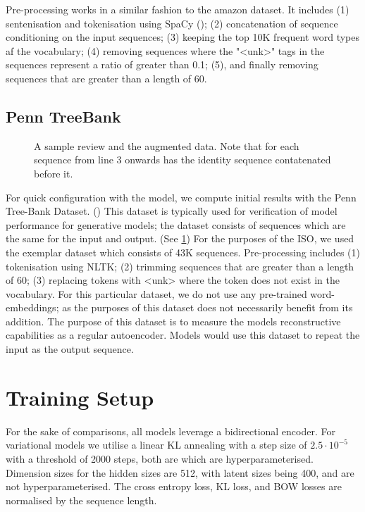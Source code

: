 \documentclass[12pt,twoside]{report}
\begin{document}
Pre-processing works in a similar fashion to the amazon dataset. It includes (1) sentenisation and tokenisation using SpaCy (\cite{honnibal_spacy_2017}); (2) concatenation of sequence conditioning on the input sequences; (3) keeping the top 10K frequent word types af the vocabulary; (4) removing sequences where the "<unk>" tags in the sequences represent a ratio of greater than 0.1; (5), and finally removing sequences that are greater than a length of 60. 

\subsection{Penn TreeBank}

\begin{figure}[!ht]
	\centering
	
	\caption{A sample review and the augmented data. Note that for each sequence from line 3 onwards has the identity sequence contatenated before it. \label{ex_dataset:ptb}}
	\end{figure}

For quick configuration with the model, we compute initial results with the Penn Tree-Bank Dataset. (\cite{marcus_building_2002}) This dataset is typically used for verification of model performance for generative models; the dataset consists of sequences which are the same for the input and output. (See \ref{ex_dataset:ptb}) For the purposes of the ISO, we used the exemplar dataset which consists of 43K sequences. Pre-processing includes (1) tokenisation using NLTK; (2) trimming sequences that are greater than a length of 60; (3) replacing tokens with <unk> where the token does not exist in the vocabulary. For this particular dataset, we do not use any pre-trained word-embeddings; as the purposes of this dataset does not necessarily benefit from its addition. The purpose of this dataset is to measure the models reconstructive capabilities as a regular autoencoder. Models would use this dataset to repeat the input as the output sequence.

\section{Training Setup}

For the sake of comparisons, all models leverage a bidirectional encoder. For variational models we utilise a linear KL annealing with a step size of $2.5\cdot 10^{-5}$ with a threshold of 2000 steps, both are which are hyperparameterised. Dimension sizes for the hidden sizes are 512, with latent sizes being 400, and are not hyperparameterised. The cross entropy loss, KL loss, and BOW losses are normalised by the sequence length. 
\end{document}
